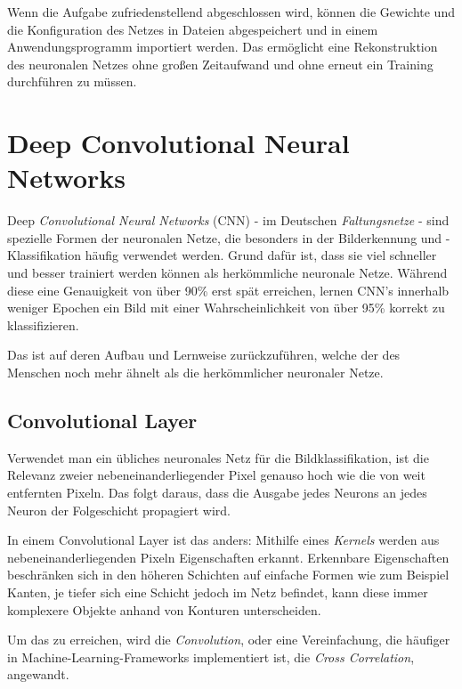 \documentclass[12pt,a4]{article}
\begin{document}
Wenn die Aufgabe zufriedenstellend abgeschlossen wird, können die Gewichte und die Konfiguration des Netzes in Dateien abgespeichert und in einem Anwendungsprogramm importiert werden. Das ermöglicht eine Rekonstruktion des neuronalen Netzes ohne großen Zeitaufwand und ohne erneut ein Training durchführen zu müssen.

\section{Deep Convolutional Neural Networks \cite{PythonMachineLearningChapter15}}\label{sec:DCNN}
Deep \textit{Convolutional Neural Networks} (CNN) - im Deutschen \textit{Faltungsnetze} - sind spezielle Formen der neuronalen Netze, die besonders in der Bilderkennung und -Klassifikation häufig verwendet werden. Grund dafür ist, dass sie viel schneller und besser trainiert werden können als herkömmliche neuronale Netze. Während diese eine Genauigkeit von über 90\% erst spät erreichen, lernen CNN's innerhalb weniger Epochen ein Bild mit einer Wahrscheinlichkeit von über 95\% korrekt zu klassifizieren.

Das ist auf deren Aufbau und Lernweise zurückzuführen, welche der des Menschen noch mehr ähnelt als die herkömmlicher neuronaler Netze.

\subsection{Convolutional Layer}\label{sec:ConvolutionalLayer}
Verwendet man ein übliches neuronales Netz für die Bildklassifikation, ist die Relevanz zweier nebeneinanderliegender Pixel genauso hoch wie die von weit entfernten Pixeln. Das folgt daraus, dass die Ausgabe jedes Neurons an jedes Neuron der Folgeschicht propagiert wird.

In einem Convolutional Layer ist das anders: Mithilfe eines \textit{Kernels} werden aus nebeneinanderliegenden Pixeln Eigenschaften erkannt. Erkennbare Eigenschaften beschränken sich in den höheren Schichten auf einfache Formen wie zum Beispiel Kanten, je tiefer sich eine Schicht jedoch im Netz befindet, kann diese immer komplexere Objekte anhand von Konturen unterscheiden.

Um das zu erreichen, wird die \textit{Convolution}, oder eine Vereinfachung, die häufiger in Machine-Learning-Frameworks implementiert ist, die\textit{ Cross Correlation}, angewandt.
\end{document}
